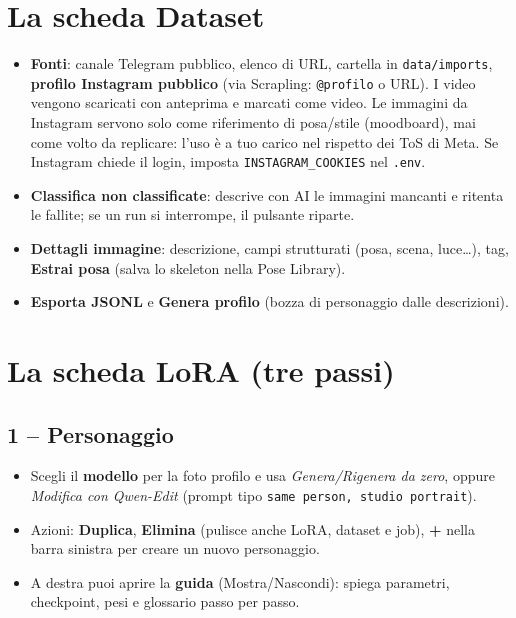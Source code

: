 \documentclass[11pt,a4paper]{article}
\begin{document}
\section{La scheda Dataset}
\begin{itemize}
  \item \textbf{Fonti}: canale Telegram pubblico, elenco di URL, cartella in \texttt{data/imports}, \textbf{profilo Instagram pubblico} (via Scrapling: \texttt{@profilo} o URL). I video vengono scaricati con anteprima e marcati come video. Le immagini da Instagram servono solo come riferimento di posa/stile (moodboard), mai come volto da replicare: l'uso \`e a tuo carico nel rispetto dei ToS di Meta. Se Instagram chiede il login, imposta \texttt{INSTAGRAM\_COOKIES} nel \texttt{.env}.
  \item \textbf{Classifica non classificate}: descrive con AI le immagini mancanti e ritenta le fallite; se un run si interrompe, il pulsante riparte.
  \item \textbf{Dettagli immagine}: descrizione, campi strutturati (posa, scena, luce\ldots), tag, \textbf{Estrai posa} (salva lo skeleton nella Pose Library).
  \item \textbf{Esporta JSONL} e \textbf{Genera profilo} (bozza di personaggio dalle descrizioni).
\end{itemize}

\section{La scheda LoRA (tre passi)}
\subsection{1 -- Personaggio}
\begin{itemize}
  \item Scegli il \textbf{modello} per la foto profilo e usa \emph{Genera/Rigenera da zero}, oppure \emph{Modifica con Qwen-Edit} (prompt tipo \texttt{same person, studio portrait}).
  \item Azioni: \textbf{Duplica}, \textbf{Elimina} (pulisce anche LoRA, dataset e job), \textbf{+} nella barra sinistra per creare un nuovo personaggio.
  \item A destra puoi aprire la \textbf{guida} (Mostra/Nascondi): spiega parametri, checkpoint, pesi e glossario passo per passo.
\end{itemize}
\end{document}

